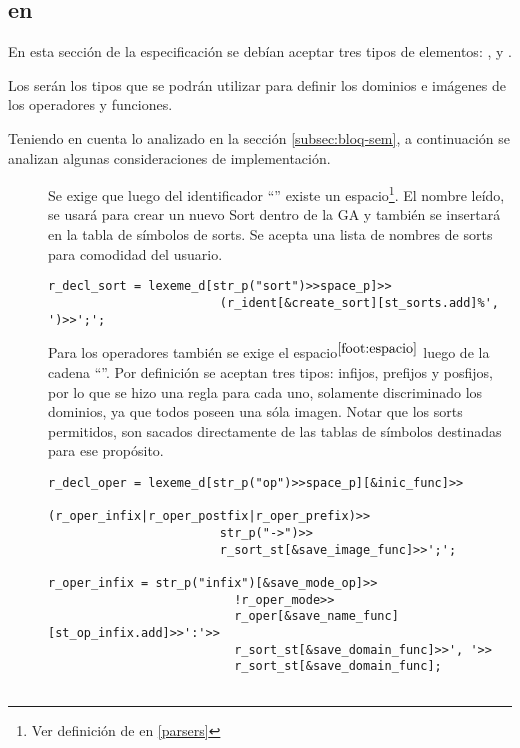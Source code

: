 \subsection{ en \spirit}

En esta sección de la especificación se debían aceptar tres tipos de elementos: ,  y .

Los  serán los tipos que se podrán utilizar para definir los dominios e imágenes de los operadores y funciones.

Teniendo en cuenta lo analizado en la sección \ref{subsec:bloq-sem}, a continuación se analizan algunas consideraciones de implementación.

\begin{description}
\item [] Se exige que luego del identificador ``'' existe un espacio\footnote{\label{foot:espacio}Ver definición de  en \ref{parsers}}. El nombre leído, se usará para crear un nuevo Sort dentro de la GA y también se insertará en la tabla de símbolos de sorts. Se acepta una lista de nombres de sorts para comodidad del usuario.

\begin{lstlisting}[columns=fullflexible, linewidth=11cm]
r_decl_sort = lexeme_d[str_p("sort")>>space_p]>>
                        (r_ident[&create_sort][st_sorts.add]%', ')>>';';
\end{lstlisting}

\item [] Para los operadores también se exige el espacio$^{\ref{foot:espacio}}$ luego de la cadena ``''. Por definición se aceptan tres tipos: infijos, prefijos y posfijos, por lo que se hizo una regla para cada uno, solamente discriminado los dominios, ya que todos poseen una sóla imagen. Notar que los sorts permitidos, son sacados directamente de las tablas de símbolos destinadas para ese propósito.

\begin{lstlisting}[columns=fullflexible, linewidth=12.5cm]
r_decl_oper = lexeme_d[str_p("op")>>space_p][&inic_func]>>
                        (r_oper_infix|r_oper_postfix|r_oper_prefix)>>
                        str_p("->")>>
                        r_sort_st[&save_image_func]>>';';

r_oper_infix = str_p("infix")[&save_mode_op]>>
                          !r_oper_mode>>
                          r_oper[&save_name_func][st_op_infix.add]>>':'>>
                          r_sort_st[&save_domain_func]>>', '>>
                          r_sort_st[&save_domain_func];


\end{lstlisting}
\end{description}
